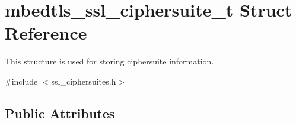 \hypertarget{structmbedtls__ssl__ciphersuite__t}{}\section{mbedtls\+\_\+ssl\+\_\+ciphersuite\+\_\+t Struct Reference}
\label{structmbedtls__ssl__ciphersuite__t}


This structure is used for storing ciphersuite information.  




{\ttfamily \#include $<$ssl\+\_\+ciphersuites.\+h$>$}

\subsection*{Public Attributes}
